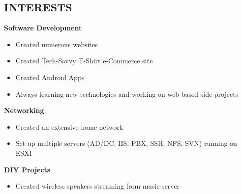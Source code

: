 \documentclass[line, margin]{res}
\begin{document}
\begin{resume}
\section{INTERESTS}
\textbf{Software Development}
\begin{itemize}[leftmargin=10pt]
\item Created numerous websites
\item Created Tech-Savvy T-Shirt e-Commerce site
\item Created Android Apps
\item Always learning new technologies and working on web-based side projects
\end{itemize}
\textbf{Networking}
\begin{itemize}[leftmargin=10pt]
\item Created an extensive home network
\item Set up multiple servers (AD/DC, IIS, PBX, SSH, NFS, SVN) running on ESXI
\end{itemize}
\textbf{DIY Projects}
\begin{itemize}[leftmargin=10pt]
\item Created wireless speakers streaming from music server
\end{itemize}
\end{resume}
\end{document}
